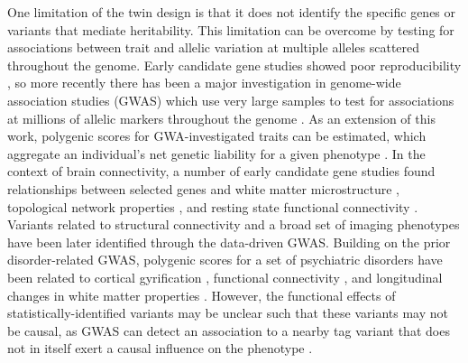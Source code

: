 One limitation of the twin design is that it does not identify the specific genes or variants that mediate heritability. This limitation can be overcome by testing for associations between trait and allelic variation at multiple alleles scattered throughout the genome. Early candidate gene studies showed poor reproducibility \citep{Hutchison2004,Sullivan2007}, so more recently there has been a major investigation in genome-wide association studies (GWAS) which use very large samples to test for associations at millions of allelic markers throughout the genome \citep{Bush2012}. As an extension of this work, polygenic scores for GWA-investigated traits can be estimated, which aggregate an individual’s net genetic liability for a given phenotype \citep{Torkamani2018}. In the context of brain connectivity, a number of early candidate gene studies found relationships between selected genes and white matter microstructure \citep{Braskie2012,Chiang2011,Jahanshad2012b}, topological network properties \citep{Dennis2011}, and resting state functional connectivity \citep{Filippini2009,Trachtenberg2012,Westlye2011}. Variants related to structural connectivity \citep{Chiang2009,Jahanshad2012a,Jahanshad2013} and a broad set of imaging phenotypes \citep{Elliott2018} have been later identified through the data-driven GWAS. Building on the prior disorder-related GWAS, polygenic scores for a set of psychiatric disorders have been related to cortical gyrification \citep{Liu2016a}, functional connectivity \citep{Dezhina2018,Sadeh2018,Wang2017}, and longitudinal changes in white matter properties \citep{Alloza2018}. However, the functional effects of statistically-identified variants may be unclear such that these variants may not be causal, as GWAS can detect an association to a nearby tag variant that does not in itself exert a causal influence on the phenotype \citep{Wang2010}.

